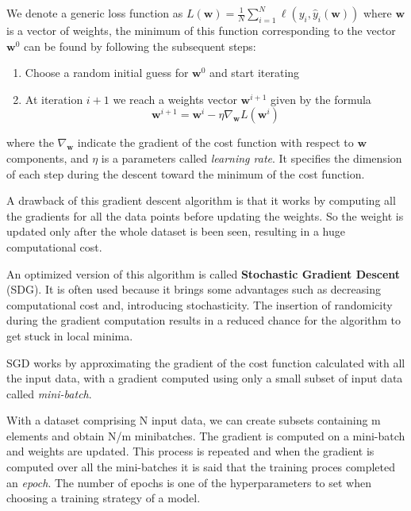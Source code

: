 \documentclass[11pt]{report}
\begin{document}
We denote a generic loss function as $L(\mathbf{w}) = \frac{1}{N}\sum_{i = 1}^N \ell(y_i, \hat y_i(\mathbf{w}))$ where $\mathbf{w}$ is a vector of weights, the minimum of this function corresponding to the vector $\mathbf{w}^0$ can be found by following the subsequent steps:

\begin{enumerate}
\item Choose a random initial guess for $\mathbf{w}^{0}$ and start iterating
\item At iteration $i+1$ we reach a weights vector $\mathbf{w}^{i+1}$ given by the formula
\begin{equation}\label{eq:weights_update}
\mathbf{w}^{i+1} = \mathbf{w}^{i} - \eta \nabla_\mathbf{w} L(\mathbf{w}^i)
\end{equation}
\end{enumerate}

 where the $\nabla_\mathbf{w}$ indicate the gradient of the cost function with respect to $\mathbf{w}$ components, and $\eta$ is a parameters called \emph{learning rate}.
 It specifies the dimension of each step during the descent toward the minimum of the cost function.


A drawback of this gradient descent algorithm is that it works by computing all the gradients for all the data points before updating the weights.
So the weight is updated only after the whole dataset is been seen, resulting in a huge computational cost.

An optimized version of this algorithm is called \textbf{Stochastic Gradient Descent} (SDG).
It is often used because it brings some advantages such as decreasing computational cost and, introducing stochasticity.
The insertion of randomicity during the gradient computation results in a reduced chance for the algorithm to get stuck in local minima.

SGD works by approximating the gradient of the cost function calculated with all the input data, with a gradient computed using only a small subset of input data called \emph{mini-batch}.

With a dataset comprising N input data, we can create subsets containing m elements and obtain N/m minibatches.
The gradient is computed on a mini-batch and weights are updated.
This process is repeated and when the gradient is computed over all the mini-batches it is said that the training proces completed an \emph{epoch}.
The number of epochs is one of the hyperparameters to set when choosing a training strategy of a model.
\end{document}
